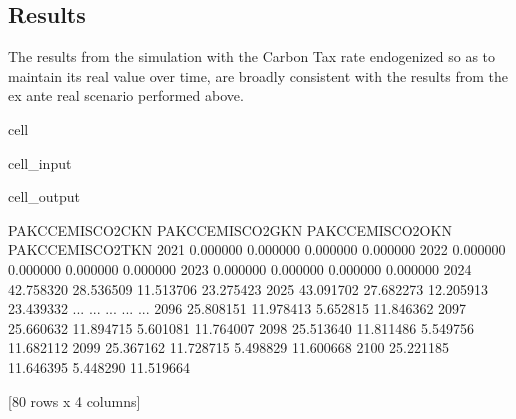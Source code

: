 \documentclass[letterpaper,10pt,english]{jupyterBook}
\begin{document}
\subsection{Results}
\label{\detokenize{content/05_WBModels/MoreComplexScenarios:results}}
\sphinxAtStartPar
The results from the simulation with the Carbon Tax rate endogenized so as to maintain its real value over time, are broadly consistent with the results from the ex ante real scenario performed above.

\begin{sphinxuseclass}{cell}\begin{sphinxVerbatimInput}

\begin{sphinxuseclass}{cell_input}
\begin{sphinxVerbatim}[commandchars=\\\{\}]
\PYG{p}{[}\PYG{p}{]}
\end{sphinxVerbatim}

\end{sphinxuseclass}\end{sphinxVerbatimInput}
\begin{sphinxVerbatimOutput}

\begin{sphinxuseclass}{cell_output}
\begin{sphinxVerbatim}[commandchars=\\\{\}]
      PAKCCEMISCO2CKN  PAKCCEMISCO2GKN  PAKCCEMISCO2OKN  PAKCCEMISCO2TKN
2021         0.000000         0.000000         0.000000         0.000000
2022         0.000000         0.000000         0.000000         0.000000
2023         0.000000         0.000000         0.000000         0.000000
2024       \PYGZhy{}42.758320       \PYGZhy{}28.536509       \PYGZhy{}11.513706       \PYGZhy{}23.275423
2025       \PYGZhy{}43.091702       \PYGZhy{}27.682273       \PYGZhy{}12.205913       \PYGZhy{}23.439332
...               ...              ...              ...              ...
2096       \PYGZhy{}25.808151       \PYGZhy{}11.978413        \PYGZhy{}5.652815       \PYGZhy{}11.846362
2097       \PYGZhy{}25.660632       \PYGZhy{}11.894715        \PYGZhy{}5.601081       \PYGZhy{}11.764007
2098       \PYGZhy{}25.513640       \PYGZhy{}11.811486        \PYGZhy{}5.549756       \PYGZhy{}11.682112
2099       \PYGZhy{}25.367162       \PYGZhy{}11.728715        \PYGZhy{}5.498829       \PYGZhy{}11.600668
2100       \PYGZhy{}25.221185       \PYGZhy{}11.646395        \PYGZhy{}5.448290       \PYGZhy{}11.519664

[80 rows x 4 columns]
\end{sphinxVerbatim}

\end{sphinxuseclass}\end{sphinxVerbatimOutput}

\end{sphinxuseclass}
\end{document}
